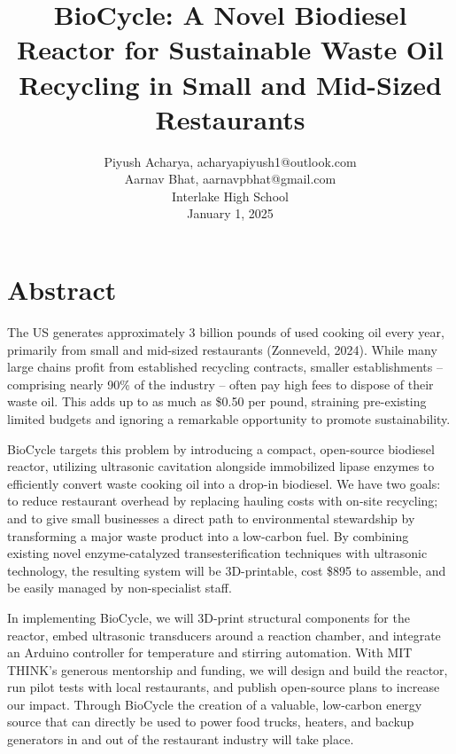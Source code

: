 \documentclass[10pt,twocolumn]{article}
\begin{document}
\title{\textbf{BioCycle: A Novel Biodiesel Reactor for Sustainable Waste Oil Recycling in Small and Mid-Sized Restaurants}}
\author{Piyush Acharya, acharyapiyush1@outlook.com\\
Aarnav Bhat, aarnavpbhat@gmail.com\\
Interlake High School\\
January 1, 2025}
\date{}
\maketitle

\section*{Abstract}
The US generates approximately 3 billion pounds of used cooking oil every year, primarily from small and mid-sized restaurants (Zonneveld, 2024). While many large chains profit from established recycling contracts, smaller establishments – comprising nearly 90\% of the industry – often pay high fees to dispose of their waste oil. This adds up to as much as \$0.50 per pound, straining pre-existing limited budgets and ignoring a remarkable opportunity to promote sustainability.

BioCycle targets this problem by introducing a compact, open-source biodiesel reactor, utilizing ultrasonic cavitation alongside immobilized lipase enzymes to efficiently convert waste cooking oil into a drop-in biodiesel. We have two goals: to reduce restaurant overhead by replacing hauling costs with on-site recycling; and to give small businesses a direct path to environmental stewardship by transforming a major waste product into a low-carbon fuel. By combining existing novel enzyme-catalyzed transesterification techniques with ultrasonic technology, the resulting system will be 3D-printable, cost \$895 to assemble, and be easily managed by non-specialist staff.

In implementing BioCycle, we will 3D-print structural components for the reactor, embed ultrasonic transducers around a reaction chamber, and integrate an Arduino controller for temperature and stirring automation. With MIT THINK’s generous mentorship and funding, we will design and build the reactor, run pilot tests with local restaurants, and publish open-source plans to increase our impact. Through BioCycle the creation of a valuable, low-carbon energy source that can directly be used to power food trucks, heaters, and backup generators in and out of the restaurant industry will take place.
\end{document}
